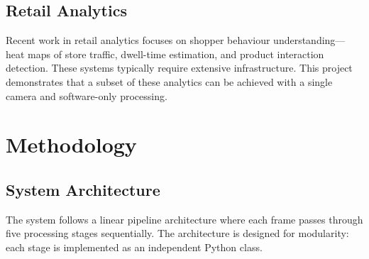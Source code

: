 \documentclass[12pt,a4paper]{article}
\begin{document}
\subsection{Retail Analytics}

Recent work in retail analytics focuses on shopper behaviour understanding—heat maps of store traffic, dwell-time estimation, and product interaction detection.
These systems typically require extensive infrastructure.
This project demonstrates that a subset of these analytics can be achieved with a single camera and software-only processing.

\section{Methodology}

\subsection{System Architecture}

The system follows a linear pipeline architecture where each frame passes through five processing stages sequentially.
The architecture is designed for modularity: each stage is implemented as an independent Python class.

\begin{center}
\end{center}
\end{document}
